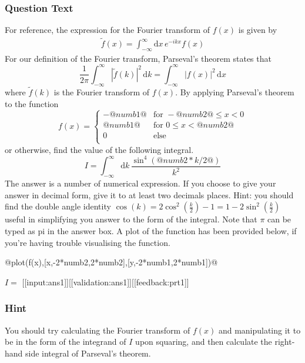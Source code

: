 \documentclass[a4paper,10pt]{article}
\begin{document}
\subsubsection{Question Text}
For reference, the expression for the Fourier transform of $f(x)$ is given by \begin{align*}
\tilde{f}(x) = \int_{-\infty}^{\infty} \text{d}x \, e^{-ikx}f(x)
\end{align*}For our definition of the Fourier transform, Parseval's theorem states that \[ \frac{1}{2\pi}\int_{-\infty}^{\infty} |\tilde{f}(k)|^2 \, \text{d}k = \int_{-\infty}^{\infty} |f(x)|^2 \, \text{d}x \]where \(\tilde{f}(k)\) is the Fourier transform of \(f(x)\). By applying Parseval's theorem to the function \[ f(x) = \begin{cases} -@numb1@ & \text{for } -@numb2@ \leq x < 0\\ @numb1@ & \text{for } 0\leq x<@numb2@ \\ 0 & \text{else} \\ \end{cases} \] or otherwise, find the value of the following integral. \[ I = \int_{-\infty}^{\infty}\text{d}k \, \frac{\sin^4(@numb2*k/2@)}{k^2} \] The answer is a number of numerical expression. If you choose to give your answer in decimal form, give it to at least two decimals places. Hint: you should find the double angle identity \(\cos(k) = 2\cos^2(\frac{k}{2}) -1 = 1 - 2\sin^2(\frac{k}{2})\) useful in simplifying you answer to the form of the integral. Note that \(\pi\) can be typed as pi in the answer box. A plot of the function has been provided below, if you're having trouble visualising the function.

@plot(f(x),[x,-2*numb2,2*numb2],[y,-2*numb1,2*numb1])@

\(I = \) [[input:ans1]][[validation:ans1]][[feedback:prt1]]
\subsubsection{Hint}
You should try calculating the Fourier transform of \(f(x)\) and manipulating it to be in the form of the integrand of \(I\) upon squaring, and then calculate the right-hand side integral of Parseval's theorem.
\end{document}
